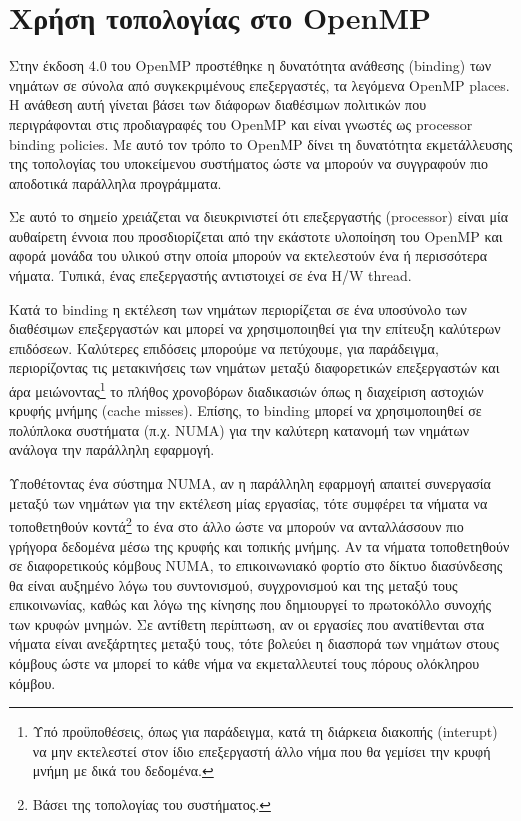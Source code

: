 \newpage

\section{Χρήση τοπολογίας στο OpenMP}
\label{sec:Topology in OpenMP}
Στην έκδοση 4.0 του OpenMP προστέθηκε η δυνατότητα ανάθεσης (binding) των νημάτων σε σύνολα από συγκεκριμένους επεξεργαστές, τα λεγόμενα OpenMP places. Η ανάθεση αυτή γίνεται βάσει των διάφορων διαθέσιμων πολιτικών που περιγράφονται στις προδιαγραφές του OpenMP και είναι γνωστές ως processor binding policies. Με αυτό τον τρόπο το OpenMP δίνει τη δυνατότητα εκμετάλλευσης της τοπολογίας του υποκείμενου συστήματος ώστε %
να μπορούν να συγγραφούν πιο αποδοτικά παράλληλα προγράμματα.

Σε αυτό το σημείο χρειάζεται να διευκρινιστεί ότι επεξεργαστής (processor) είναι μία αυθαίρετη έννοια που προσδιορίζεται από την εκάστοτε υλοποίηση του OpenMP και αφορά μονάδα του υλικού στην οποία μπορούν να εκτελεστούν ένα ή περισσότερα νήματα. Τυπικά, ένας επεξεργαστής αντιστοιχεί σε ένα H/W thread.

Κατά το binding η εκτέλεση των νημάτων περιορίζεται σε ένα υποσύνολο των διαθέσιμων επεξεργαστών και μπορεί να χρησιμοποιηθεί για την επίτευξη καλύτερων επιδόσεων. Καλύτερες επιδόσεις μπορούμε να πετύχουμε, για παράδειγμα, περιορίζοντας τις μετακινήσεις των νημάτων μεταξύ διαφορετικών επεξεργαστών και άρα μειώνοντας\footnote{Υπό προϋποθέσεις, όπως για παράδειγμα, κατά τη διάρκεια διακοπής (interupt) να μην εκτελεστεί στον ίδιο επεξεργαστή άλλο νήμα που θα γεμίσει την κρυφή μνήμη με δικά του δεδομένα.} το πλήθος χρονοβόρων διαδικασιών όπως η διαχείριση αστοχιών κρυφής μνήμης (cache misses). Επίσης, το binding μπορεί να χρησιμοποιηθεί σε πολύπλοκα συστήματα (π.χ. NUMA) για την καλύτερη κατανομή των νημάτων ανάλογα την παράλληλη εφαρμογή.

Υποθέτοντας ένα σύστημα NUMA, αν η παράλληλη εφαρμογή απαιτεί συνεργασία μεταξύ των νημάτων για την εκτέλεση μίας εργασίας, τότε συμφέρει τα νήματα να τοποθετηθούν κοντά\footnote{Βάσει της τοπολογίας του συστήματος.} το ένα στο άλλο ώστε να μπορούν να ανταλλάσσουν πιο γρήγορα δεδομένα μέσω της κρυφής και τοπικής μνήμης. Αν τα νήματα τοποθετηθούν σε διαφορετικούς κόμβους NUMA, το επικοινωνιακό φορτίο στο δίκτυο διασύνδεσης θα είναι αυξημένο λόγω του συντονισμού, συγχρονισμού και της μεταξύ τους επικοινωνίας, καθώς και λόγω της κίνησης που δημιουργεί το πρωτοκόλλο συνοχής των κρυφών μνημών. Σε αντίθετη περίπτωση, αν οι εργασίες που ανατίθενται στα νήματα είναι ανεξάρτητες μεταξύ τους, τότε βολεύει η διασπορά των νημάτων στους κόμβους ώστε να μπορεί το κάθε νήμα να εκμεταλλευτεί τους πόρους ολόκληρου κόμβου.



